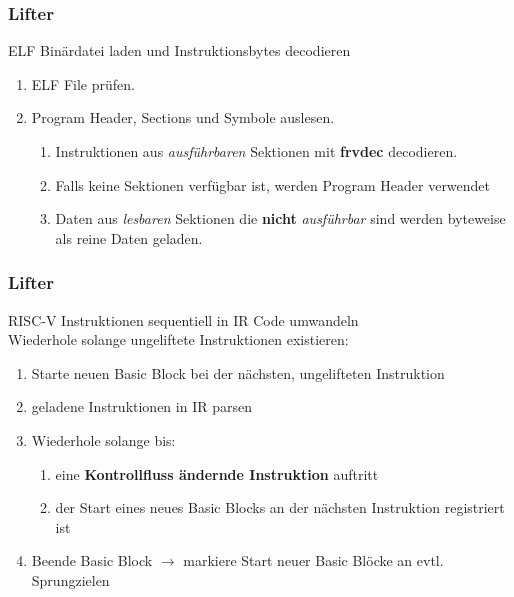 
\begin{frame}[fragile]
    \frametitle{Lifter}{ELF Binärdatei laden und Instruktionsbytes decodieren}
    \begin{enumerate}
        \setlength\itemsep{0.6em}
        \item ELF File prüfen.
        \item Program Header, Sections und Symbole auslesen.
              \vspace{0.5em}
              \begin{enumerate}
                  \setlength\itemsep{0.6em}
                  \item Instruktionen aus \textit{ausführbaren} Sektionen mit \textbf{frvdec} decodieren.
                  \item Falls keine Sektionen verfügbar ist, werden Program Header verwendet
                  \item Daten aus \textit{lesbaren} Sektionen die \textbf{nicht} \textit{ausführbar} sind werden
                        byteweise als reine Daten geladen.
              \end{enumerate}
    \end{enumerate}
\end{frame}
\clearpage


\begin{frame}
    \frametitle{Lifter}{RISC-V Instruktionen sequentiell in IR Code umwandeln}
    \\\vspace{0.5em}
    Wiederhole solange ungeliftete Instruktionen existieren:
    \begin{enumerate}
        \setlength{\itemsep}{0.8em}
        \item Starte neuen Basic Block bei der nächsten, ungelifteten Instruktion
        \item geladene Instruktionen in IR parsen
        \item Wiederhole solange bis:
              \begin{enumerate}
                  \vspace{1em}
                  \setlength{\itemsep}{1em}
                  \item eine \textbf{Kontrollfluss ändernde Instruktion} auftritt
                  \item der Start eines
                        neues Basic Blocks an der nächsten Instruktion registriert ist
              \end{enumerate}
        \item Beende Basic Block $\rightarrow$ markiere Start neuer Basic Blöcke an evtl. Sprungzielen
    \end{enumerate}
\end{frame}
\clearpage


